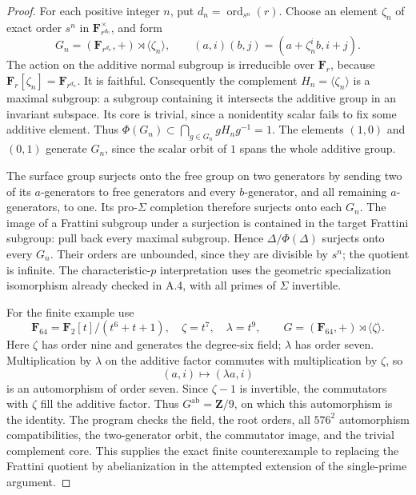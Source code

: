 \documentclass[11pt,a4paper]{article}
\begin{document}
\begin{proof}
For each positive integer $n$, put $d_n=\operatorname{ord}_{s^n}(r)$.
Choose an element $\zeta_n$ of exact order $s^n$ in
$\mathbf F_{r^{d_n}}^\times$, and form
\[
 G_n=(\mathbf F_{r^{d_n}},+)\rtimes\langle\zeta_n\rangle,
 \qquad (a,i)(b,j)=(a+\zeta_n^i b,i+j).
\]
The action on the additive normal subgroup is irreducible over
$\mathbf F_r$, because $\mathbf F_r[\zeta_n]=\mathbf F_{r^{d_n}}$.
It is faithful. Consequently the complement $H_n=\langle\zeta_n\rangle$
is a maximal subgroup: a subgroup containing it intersects the
additive group in an invariant subspace. Its core is trivial,
since a nonidentity scalar fails to fix some additive element.
Thus $\Phi(G_n)\subset\bigcap_{g\in G_n}gH_ng^{-1}=1$.
The elements $(1,0)$ and $(0,1)$ generate $G_n$, since the scalar
orbit of $1$ spans the whole additive group.

The surface group surjects onto the free group on two generators
by sending two of its $a$-generators to free generators and every
$b$-generator, and all remaining $a$-generators, to one. Its
pro-$\Sigma$ completion therefore surjects onto each $G_n$.
The image of a Frattini subgroup under a surjection is contained
in the target Frattini subgroup: pull back every maximal subgroup.
Hence $\Delta/\Phi(\Delta)$ surjects onto every $G_n$.
Their orders are unbounded, since they are divisible by $s^n$;
the quotient is infinite. The characteristic-$p$ interpretation
uses the geometric specialization isomorphism already checked in
A.4, with all primes of $\Sigma$ invertible.

For the finite example use
\[
 \mathbf F_{64}=\mathbf F_2[t]/(t^6+t+1),\quad
 \zeta=t^7,\quad\lambda=t^9,
 \qquad G=(\mathbf F_{64},+)\rtimes\langle\zeta\rangle.
\]
Here $\zeta$ has order nine and generates the degree-six field;
$\lambda$ has order seven. Multiplication by $\lambda$ on the
additive factor commutes with multiplication by $\zeta$, so
\[
                    (a,i)\longmapsto(\lambda a,i)
\]
is an automorphism of order seven. Since $\zeta-1$ is invertible,
the commutators with $\zeta$ fill the additive factor. Thus
$G^{\mathrm{ab}}=\mathbf Z/9$, on which this automorphism is
the identity. The program 
checks the field, the root orders, all $576^2$ automorphism
compatibilities, the two-generator orbit, the commutator image,
and the trivial complement core. This supplies the exact finite
counterexample to replacing the Frattini quotient by abelianization
in the attempted extension of the single-prime argument.
\end{proof}
\end{document}
